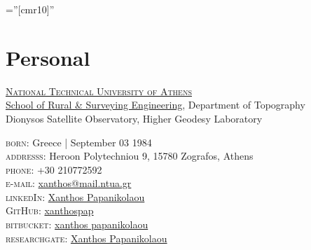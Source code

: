 \documentclass[8pt]{extarticle} %
\begin{document}
\pagestyle{empty} %
\font\fb=''[cmr10]'' %

\par{\medskip\par} %

\section{Personal}
\textsc{\href{http://www.ntua.gr/}{National Technical University of Athens}} \\
\href{http://www.survey.ntua.gr/}{School of Rural \& Surveying Engineering}, Department of Topography\\
Dionysos Satellite Observatory, Higher Geodesy Laboratory
\begin{multicols}{2}
\textsc{born:} Greece | September 03 1984\\
\textsc{addresss:} Heroon Polytechniou 9, 15780 Zografos, Athens\\
\textsc{phone:} +30 210772592\\
\textsc{e-mail:} \href{mailto:xanthos@mail.ntua.gr}{xanthos@mail.ntua.gr}\\
\textsc{linkedIn:} \href{https://www.linkedin.com/in/xanthos-papanikolaou-3125a0147/}{Xanthos Papanikolaou}\\
\textsc{GitHub:} \href{https://github.com/xanthospap}{xanthospap}\\
\textsc{bitbucket:} \href{https://bitbucket.org/%7B0e50e3f1-d363-4bc7-a391-a5d492995de3%7D/}{xanthos papanikolaou}\\
\textsc{researchgate:} \href{https://www.researchgate.net/profile/Xanthos_Papanikolaou}{Xanthos Papanikolaou}
\end{multicols} \par
\end{document}
